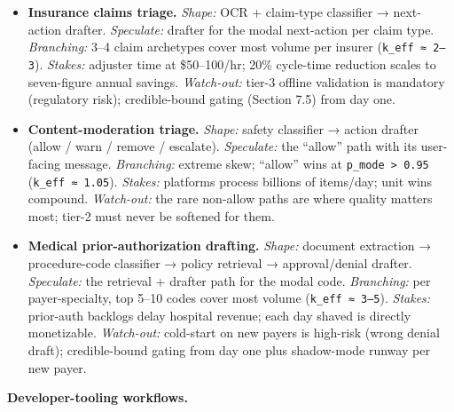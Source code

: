 \documentclass[
  11pt,
]{article}
\begin{document}
\begin{itemize}
\item
  \textbf{Insurance claims triage.} \emph{Shape:} OCR + claim-type
  classifier → next-action drafter. \emph{Speculate:} drafter for the
  modal next-action per claim type. \emph{Branching:} 3--4 claim
  archetypes cover most volume per insurer (\texttt{k\_eff\ ≈\ 2–3}).
  \emph{Stakes:} adjuster time at \$50--100/hr; 20\% cycle-time
  reduction scales to seven-figure annual savings. \emph{Watch-out:}
  tier-3 offline validation is mandatory (regulatory risk);
  credible-bound gating (Section 7.5) from day one.
\item
  \textbf{Content-moderation triage.} \emph{Shape:} safety classifier →
  action drafter (allow / warn / remove / escalate). \emph{Speculate:}
  the ``allow'' path with its user-facing message. \emph{Branching:}
  extreme skew; ``allow'' wins at \texttt{p\_mode\ \textgreater{}\ 0.95}
  (\texttt{k\_eff\ ≈\ 1.05}). \emph{Stakes:} platforms process billions
  of items/day; unit wins compound. \emph{Watch-out:} the rare non-allow
  paths are where quality matters most; tier-2 must never be softened
  for them.
\item
  \textbf{Medical prior-authorization drafting.} \emph{Shape:} document
  extraction → procedure-code classifier → policy retrieval →
  approval/denial drafter. \emph{Speculate:} the retrieval + drafter
  path for the modal code. \emph{Branching:} per payer-specialty, top
  5--10 codes cover most volume (\texttt{k\_eff\ ≈\ 3–5}).
  \emph{Stakes:} prior-auth backlogs delay hospital revenue; each day
  shaved is directly monetizable. \emph{Watch-out:} cold-start on new
  payers is high-risk (wrong denial draft); credible-bound gating from
  day one plus shadow-mode runway per new payer.
\end{itemize}

\textbf{Developer-tooling workflows.}
\end{document}
